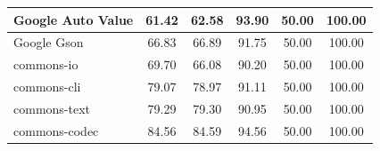 \documentclass[conference,draftclsnofoot,onecolumn]{IEEEtran}
\begin{document}
\begin{table}[ht]
\begin{tabular}{|l|c|c|c|c|c|}
Google Auto Value             & 61.42                                                                                 & 62.58                                                                                     & 93.90                                                                              & 50.00                                                                               & 100.00                                                                             \\ \hline
Google Gson                   & 66.83                                                                                 & 66.89                                                                                     & 91.75                                                                              & 50.00                                                                               & 100.00                                                                             \\ \hline
commons-io                    & 69.70                                                                                 & 66.08                                                                                     & 90.20                                                                              & 50.00                                                                               & 100.00                                                                             \\ \hline
commons-cli                   & 79.07                                                                                 & 78.97                                                                                     & 91.11                                                                              & 50.00                                                                               & 100.00                                                                             \\ \hline
commons-text                  & 79.29                                                                                 & 79.30                                                                                     & 90.95                                                                              & 50.00                                                                               & 100.00                                                                             \\ \hline
commons-codec                 & 84.56                                                                                 & 84.59                                                                                     & 94.56                                                                              & 50.00                                                                               & 100.00                                                                             \\ \hline

\end{tabular}
\end{table}
\end{document}
